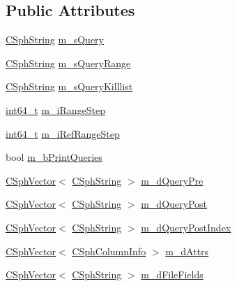 \subsection*{Public Attributes}
\begin{DoxyCompactItemize}
\item 
\hyperlink{structCSphString}{C\-Sph\-String} \hyperlink{structCSphSourceParams__SQL_af05a71de9112427c483fe1a263e49145}{m\-\_\-s\-Query}
\item 
\hyperlink{structCSphString}{C\-Sph\-String} \hyperlink{structCSphSourceParams__SQL_abc976e87cdfc0314ae2559838aa71f2c}{m\-\_\-s\-Query\-Range}
\item 
\hyperlink{structCSphString}{C\-Sph\-String} \hyperlink{structCSphSourceParams__SQL_a4dfa97949a08536878cb2e4b3a074fd9}{m\-\_\-s\-Query\-Killlist}
\item 
\hyperlink{sphinxstd_8h_a996e72f71b11a5bb8b3b7b6936b1516d}{int64\-\_\-t} \hyperlink{structCSphSourceParams__SQL_aa45440679fcf1804e57e8b0f34603c45}{m\-\_\-i\-Range\-Step}
\item 
\hyperlink{sphinxstd_8h_a996e72f71b11a5bb8b3b7b6936b1516d}{int64\-\_\-t} \hyperlink{structCSphSourceParams__SQL_ad79bc274b7ac128d8661f8e268120aed}{m\-\_\-i\-Ref\-Range\-Step}
\item 
bool \hyperlink{structCSphSourceParams__SQL_a4c6b0a7b326e25dc0947b18719c85e14}{m\-\_\-b\-Print\-Queries}
\item 
\hyperlink{classCSphVector}{C\-Sph\-Vector}$<$ \hyperlink{structCSphString}{C\-Sph\-String} $>$ \hyperlink{structCSphSourceParams__SQL_a44cc790c563dc6c7e9570acace3c6ca3}{m\-\_\-d\-Query\-Pre}
\item 
\hyperlink{classCSphVector}{C\-Sph\-Vector}$<$ \hyperlink{structCSphString}{C\-Sph\-String} $>$ \hyperlink{structCSphSourceParams__SQL_a96cc749ba71ac052e69d77b6697d64f4}{m\-\_\-d\-Query\-Post}
\item 
\hyperlink{classCSphVector}{C\-Sph\-Vector}$<$ \hyperlink{structCSphString}{C\-Sph\-String} $>$ \hyperlink{structCSphSourceParams__SQL_acf0f469cfe4a51af2aaf87724336548f}{m\-\_\-d\-Query\-Post\-Index}
\item 
\hyperlink{classCSphVector}{C\-Sph\-Vector}$<$ \hyperlink{structCSphColumnInfo}{C\-Sph\-Column\-Info} $>$ \hyperlink{structCSphSourceParams__SQL_a7b745e82f80fa820b28c53f4e701c40e}{m\-\_\-d\-Attrs}
\item 
\hyperlink{classCSphVector}{C\-Sph\-Vector}$<$ \hyperlink{structCSphString}{C\-Sph\-String} $>$ \hyperlink{structCSphSourceParams__SQL_a2e478cd5154ea0e946c5da2d2962bce2}{m\-\_\-d\-File\-Fields}

\end{DoxyCompactItemize}
